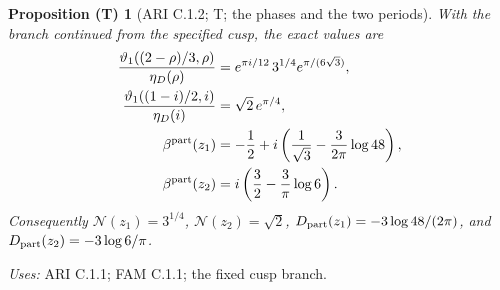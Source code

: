 \documentclass[11pt,a4paper]{article}
\theoremstyle{plain}
\newtheorem{proposition}[theorem]{Proposition (T)}
\theoremstyle{definition}
\begin{document}
\begin{proposition}[ARI C.1.2; T; the phases and the two periods]\label{ari:C.1.2}
With the branch continued from the specified cusp, the exact values are
\begin{align*}
 \frac{\vartheta _1((2-\rho)/3,\rho)}{\eta_D(\rho)}
   &=e^{\pi i/12}\,3^{1/4}e^{\pi/(6\sqrt3)},\\
 \frac{\vartheta _1((1-i)/2,i)}{\eta_D(i)}
   &=\sqrt2\,e^{\pi/4},\\
 \beta^{\rm part}(z_1)
   &=-\frac12+i\left(\frac1{\sqrt3}-\frac3{2\pi}\log48\right),\\
 \beta^{\rm part}(z_2)
   &=i\left(\frac32-\frac3\pi\log6\right).
\end{align*}
Consequently $\mathcal N(z_1)=3^{1/4}$, $\mathcal N(z_2)=\sqrt2$,
$D_{\rm part}(z_1)=-3\log48/(2\pi)$, and
$D_{\rm part}(z_2)=-3\log6/\pi$.
\end{proposition}
\noindent\textit{Uses:} ARI C.1.1; FAM C.1.1; the fixed cusp branch.\par
\end{document}
